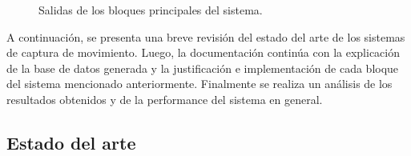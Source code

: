 \begin{figure}[H]
  \caption{Salidas de los bloques principales del sistema.}
      \label{ejemplotutiintro}
\end{figure}

A continuación, se presenta una breve revisión del estado del arte de los sistemas de captura de movimiento. Luego, la documentación continúa con la explicación de la base de datos generada y la justificación e implementación de cada bloque del sistema mencionado anteriormente. Finalmente se realiza un análisis de los resultados obtenidos y de la performance del sistema en general.

\subsection{Estado del arte}


